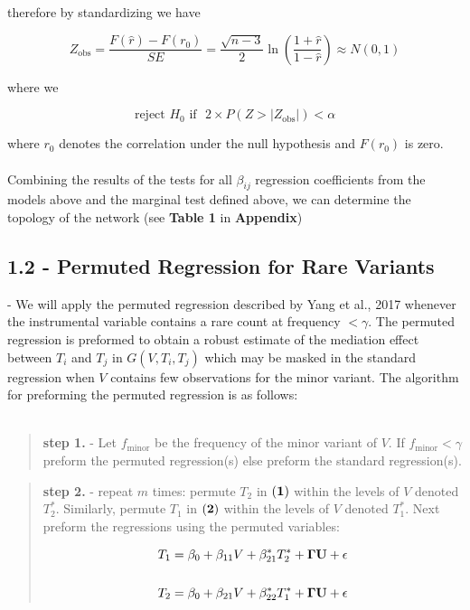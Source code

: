 \documentclass[12pt]{report}
\begin{document}
therefore by standardizing we have 

\[ Z_{\text{obs}} = \frac{F(\hat{r}) - F(r_0)}{SE} = \frac{\sqrt{n-3}}{2}\ln\left(\frac{1+\hat{r}}{1-\hat{r}}\right) \approx N(0,1) \]

where we 

\[ \text{reject $H_0$ if} \ \ \ 2\times P(Z>|Z_{\text{obs}}|)<\alpha \]

where $r_0$ denotes the correlation under the null hypothesis and $F(r_0)$ is zero.\\
\\

Combining the results of the tests for all $\beta_{ij}$ regression coefficients from the models above and the marginal test defined above, we can determine the topology of the network (see \textbf{Table 1} in \textbf{Appendix})

\subsection*{1.2 - Permuted Regression for Rare Variants} - We will apply the permuted regression described by Yang et al., 2017 whenever the instrumental variable contains a rare count at frequency $< \gamma$. The permuted regression is preformed to obtain a robust estimate of the mediation effect between $T_i$ and $T_j$ in $G(V, T_i, T_j)$ which may be masked in the standard regression when $V$ contains few observations for the minor variant. The algorithm for preforming the permuted regression is as follows:\\
\\
\begin{quote}
\textbf{step 1.} - Let $f_{\text{minor}}$ be the frequency of the minor variant of $V$. If $f_{\text{minor}} < \gamma$ preform the permuted regression(s) else preform the standard regression(s).
\end{quote}

\begin{quote}
\textbf{step 2.} - repeat $m$ times: permute $T_2$ in $\bf (1)$ within the levels of $V$ denoted $T_2^{\ast}$. Similarly, permute $T_1$ in $\bf (2)$ within the levels of $V$ denoted $T_1^{\ast}$. Next preform the regressions using the permuted variables:

\begin{eqnarray}
T_1 = \beta_0 +\beta_{11}V+\beta_{21}^{\ast}T_2^{\ast}+{\bf \Gamma U}+ \epsilon \\
\nonumber\\
T_2 = \beta_0 +\beta_{21}V+\beta_{22}^{\ast}T_1^{\ast}+{\bf \Gamma U}+ \epsilon \nonumber 
\end{eqnarray}

\end{quote}
\end{document}
